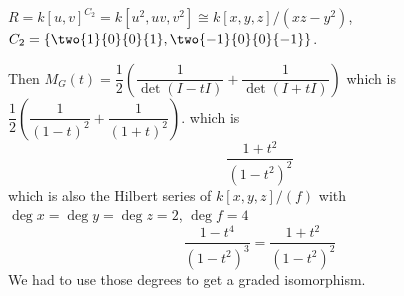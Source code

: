 \begin{ex}
$R= k[u,v]^{C_2}= k[u^2,uv,v^2] \cong k[x,y,z]/(xz-y^2)$, $C_2= \left\{ \two{1}{0}{0}{1}, \two{-1}{0}{0}{-1} \right\}$. 


Then $M_G(t) = \dfrac{1}{2} \left( \dfrac{1}{\det(I-tI)} + \dfrac{1}{\det(I+tI)}\right)$ which is $\dfrac{1}{2} \left( \dfrac{1}{(1-t)^2} + \dfrac{1}{(1+t)^2} \right)$. which is
	\[
	\dfrac{1+t^2}{(1-t^2)^2}
	\]
which is also the Hilbert series of $k[x,y,z]/(f)$ with $\deg x= \deg y= \deg z=2$, $\deg f= 4$
	\[
	\dfrac{1-t^4}{(1-t^2)^3}= \dfrac{1+t^2}{(1-t^2)^2}
	\]
We had to use those degrees to get a graded isomorphism. 
\end{ex}

























